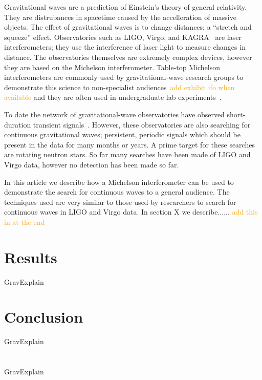 \documentclass[prb,preprint]{revtex4-1}
\newcommand{\han}{\textcolor{orange}}
\begin{document}
Gravitational waves are a prediction of Einstein's theory of general relativity. 
They are distrubances in spacetime caused by the accelleration of massive objects. 
The effect of gravitational waves is to change distances; a ``stretch and squeeze'' effect. 
Observatories such as LIGO, Virgo, and KAGRA~\cite{KAGRA:2013} are laser interferometers; they use the interference of laser light to measure changes in distance. 
The observatories themselves are extremely complex devices, however they are based on the Michelson interferometer. 
Table-top Michelson interferometers are commonly used by gravitational-wave research groups to demonstrate this science to non-specialist audiences~\cite{ThorLabsIFO,NikhefIFO}\han{add exhibit ifo when available} and they are often used in undergraduate lab experiments~\cite{UgoliniEtAl:2019}. 


To date the network of gravitational-wave observatories have observed short-duration transient signals~\cite{GWTC-1:2018,GWOSC:online}. 
However, these observatories are also searching for continuous gravitational waves; persistent, periodic signals which should be present in the data for many months or years. 
A prime target for these searches are rotating neutron stars. 
So far many searches have been made of LIGO and Virgo data, however no detection has been made so far. 


In this article we describe how a Michelson interferometer can be used to demonstrate the search for continuous waves to a general audience. 
The techniques used are very similar to those used by researchers to search for continuous waves in LIGO and Virgo data. 
In section X we describe...... \han{add this in at the end}





\section{Results}
GravExplain


\section{Conclusion}
GravExplain


\appendix
\section{}
GravExplain
\end{document}
